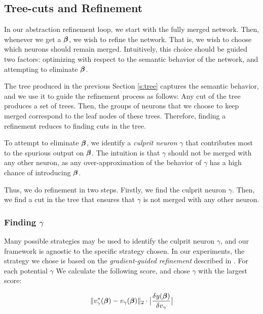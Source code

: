\subsection{Tree-cuts and Refinement}
\label{s:refinement}



In our abstraction refinement loop, we start with the fully merged network.
Then, whenever we get a \gencex $\boldsymbol{\beta}$, we
wish to refine the network. That is, we wish to choose which
neurons should remain merged. Intuitively, this choice should be guided
two factors: optimizing with respect to the semantic behavior of the network,
and attempting to eliminate $\boldsymbol{\beta}$. 

The tree produced in the previous Section \ref{s:tree} captures the semantic
behavior, and we use it to guide the refinement process as follows:
Any cut of the tree produces a set of trees. Then,  
the groups of neurons that we choose to keep merged correspond to the leaf nodes
of these trees. Therefore, finding a refinement reduces to finding cuts
in the tree.

To attempt to eliminate $\boldsymbol{\beta}$, we identify a \textit{culprit neuron}
$\gamma$ that contributes most to the spurious output on $\boldsymbol{\beta}$. The
intuition is that $\gamma$ should not be merged with any other neuron, as any
over-approximation of the behavior of $\gamma$ has a high chance of
introducing $\boldsymbol{\beta}$.

Thus, we do refinement in two steps. Firstly, we find the culprit neuron
$\gamma$. Then, we find a cut in the tree that ensures that $\gamma$ is not
merged with any other neuron.

\subsubsection{Finding $\gamma$}
\label{s:finding-gamma}

Many possible strategies may be used to identify the culprit neuron $\gamma$,
and our framework is agnostic to the specific strategy chosen. In our
experiments, the strategy we chose is based on the
\emph{gradient-guided refinement} described in \cite{lin-comb-abs-jan}. For each
potential $\gamma$ We calculate the following score, and chose $\gamma$ with the
largest score:

\begin{equation*}
\begin{aligned}
    \|v^{*}_{\gamma}(\boldsymbol{\beta}) - v_{\gamma}(\boldsymbol{\beta})\|_{2} \cdot 
    \big| \frac{\delta y(\boldsymbol{\beta})}{\delta v_{\gamma}} \big|
\end{aligned}
\end{equation*}

